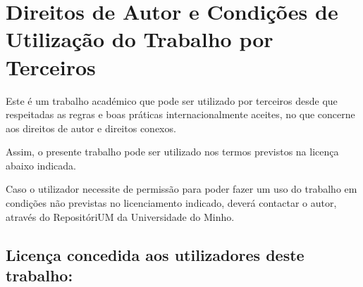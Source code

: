 \chapter*{Direitos de Autor e Condições de Utilização do Trabalho por Terceiros}
\setlength{\parskip}{1em}
\noindent
Este é um trabalho académico que pode ser utilizado por terceiros desde que respeitadas as regras e boas práticas internacionalmente aceites, no que concerne aos direitos de autor e direitos conexos.

\noindent
Assim, o presente trabalho pode ser utilizado nos termos previstos na licença abaixo indicada.

\noindent
Caso o utilizador necessite de permissão para poder fazer um uso do trabalho em condições não previstas no licenciamento indicado, deverá contactar o autor, através do RepositóriUM da Universidade do Minho.

\section*{Licença concedida aos utilizadores deste trabalho:}





